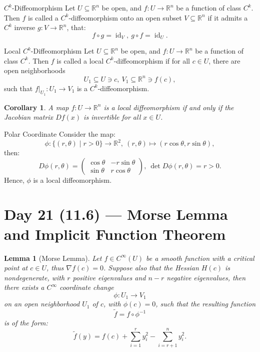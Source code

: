 \documentclass[11pt]{article}
\makeatletter
\newcounter{thmcounter}
\newenvironment{definition}[1]{\begin{defbox}{#1}{}}{\end{defbox}}
\newenvironment{example}[1]{\begin{exbox}{#1}{}}{\end{exbox}}
\theoremstyle{quiet}
\newtheorem{lemma}[thmcounter]{Lemma}
\newtheorem{corollary}[thmcounter]{Corollary}
\newtheorem{lemma}[tcb@cnt@defbox]{Lemma}
\newtheorem{corollary}[tcb@cnt@defbox]{Corollary}
\theoremstyle{quietremark}
\makeatother
\begin{document}
\begin{definition}{$C^k$-Diffeomorphism}
Let $U\subseteq\mathbb{R}^n$ be open, and $f:U\to\mathbb{R}^n$ be a function of class $C^k$. Then $f$ is called a $C^k$-diffeomorphism onto an open subset $V\subseteq\mathbb{R}^n$ if it admits a $C^k$ inverse $g:V\to \mathbb{R}^n$, that: 
\[
f\circ g=\operatorname{id}_V,~g\circ f=\operatorname{id}_U.
\]
\end{definition}

\begin{definition}{Local $C^k$-Diffeomorphism}
Let $U\subseteq\mathbb{R}^n$ be open, and $f:U\to\mathbb{R}^n$ be a function of class $C^k$. Then $f$ is called a local $C^k$-diffeomorphism if for all $c\in U$, there are open neighborhoods 
\[
U_1\subseteq U\ni c,~V_1\subseteq\mathbb{R}^n\ni f(c),
\]
such that $f|_{U_1}:U_1\to V_1$ is a $C^k$-diffeomorphism.
\end{definition}

\begin{corollary}
A map $f:U\to\mathbb{R}^n$ is a local diffeomorphism if and only if the Jacobian matrix $Df(x)$ is invertible for all $x\in U$.
\end{corollary}

\begin{example}{Polar Coordinate}
Consider the map:
\[
\phi:\{(r,\theta)\mid r>0\}\to\mathbb{R}^2,~(r,\theta)\mapsto(r\cos\theta,r\sin\theta),
\]
then:
\[
D\phi(r,\theta)=\begin{pmatrix}\cos\theta&-r\sin\theta\\\sin\theta&r\cos\theta\end{pmatrix},~\det D\phi(r,\theta)=r>0.
\]
Hence, $\phi$ is a local diffeomorphism.
\end{example}
\newpage
\section{Day 21 (11.6) --- Morse Lemma and Implicit Function Theorem}
\begin{lemma}[Morse Lemma]
Let $f\in C^\infty(U)$ be a smooth function with a critical point at $c\in U$, thus $\nabla f(c)=0$. Suppose also that the Hessian $H(c)$ is nondegenerate, with $r$ positive eigenvalues and $n-r$ negative eigenvalues, then there exists a $C^\infty$ coordinate change 
\[
\phi:U_1\to V_1
\]
on an open neighborhood $U_1$ of $c$, with $\phi(c)=0$, such that the resulting function 
\[
\tilde f=f\circ \phi^{-1}
\]
is of the form:
\[
\tilde f(y)=f(c)+\sum_{i=1}^ry_i^2-\sum_{i=r+1}^ny_i^2.
\]
\end{lemma}
\end{document}
